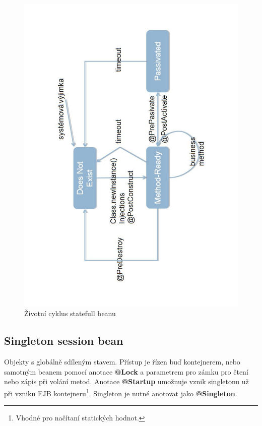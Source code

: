 \documentclass{article}
\begin{document}
\begin{figure}[H]
\begin{center}
\includegraphics[scale=0.5, angle=270]{Stateful_ejb.pdf}
\caption{Životní cyklus statefull beanu}
\end{center}
\end{figure}

\subsection*{Singleton session bean}

Objekty s globálně sdíleným stavem. Přístup je řízen buď kontejnerem, nebo samotným beanem pomocí anotace \textbf{@Lock} a parametrem pro zámku pro čtení nebo zápis při volání metod. Anotace \textbf{@Startup} umožnuje vznik singletonu už při vzniku EJB kontejneru\footnote{Vhodné pro načítaní statických hodnot.}. Singleton je nutné anotovat jako \textbf{@Singleton}.
\end{document}
